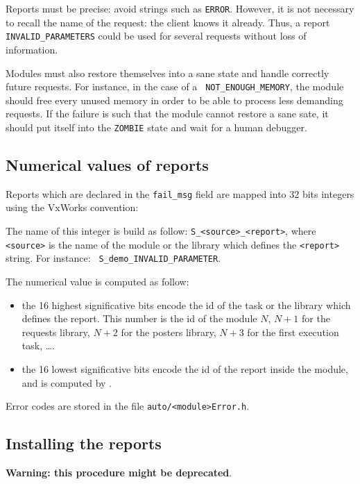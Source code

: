 Reports must be precise:  avoid strings such  as {\tt ERROR}. However, it
is not necessary to recall the name  of the request:  the client knows it
already.  Thus, a  report {\tt  INVALID\_PARAMETERS}   could be used  for
several requests without loss of information.

Modules must  also   restore  themselves into  a  sane  state  and handle
correctly future   requests.   For  instance, in  the   case  of  a  {\tt
NOT\_ENOUGH\_MEMORY}, the module should free every unused memory in order
to be able to process  less demanding requests.  If  the failure is  such
that the module cannot restore a sane sate, it should put itself into the
{\tt ZOMBIE} state and wait for a human debugger.


\subsection{Numerical values of reports}

Reports which  are declared in the {\tt  fail\_msg} field are mapped into
32 bits integers using the VxWorks convention:

The name of this integer is build as follow: {\tt S\_<source>\_<report>},
where {\tt <source>} is the name of the module or the library which defines
the      {\tt       <report>}     string.    For       instance:     {\tt
S\_demo\_INVALID\_PARAMETER}.

The numerical value is computed as follow:
\begin{itemize}
\item the 16 highest significative bits encode the id of the task or
the  library which  defines the report.   This  number is  the  id of the
module  $N$, $N+1$   for  the requests  library, $N+2$  for   the posters
library, $N+3$ for the first execution task, \ldots.

\item the 16 lowest significative bits encode the id of the report
inside the module, and is computed by \GenoM.
\end{itemize}

Error codes are stored in the file {\tt auto/<module>Error.h}.


\subsection{Installing the reports}

{\bf Warning: this procedure might be deprecated}.

